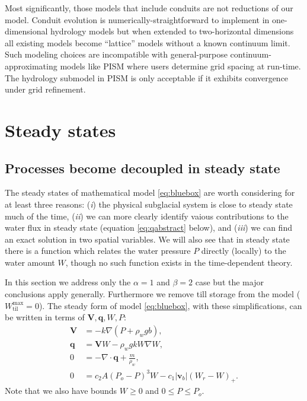 \documentclass[11pt,final]{amsart}
\newcommand\bv{\mathbf{v}}
\newcommand\bV{\mathbf{V}}
\newcommand\bq{\mathbf{q}}
\newcommand{\Div}{\nabla\cdot}
\newcommand{\grad}{\nabla}
\newcommand{\Wtilmax}{W_{\text{til}}^{\text{max}}}
\begin{document}
Most significantly, those models that include conduits \citep[among others]{Hewittetal2012,PimentelFlowers2011,Schoofmeltsupply} are not reductions of our model.  Conduit evolution is numerically-straightforward to implement in one-dimensional hydrology models \citep{Hewittetal2012,PimentelFlowers2011,vanderWeletal2013} but when extended to two-horizontal dimensions all existing models \citep{Hewitt2013,Schoofmeltsupply} become ``lattice'' models without a known continuum limit.  Such modeling choices are incompatible with general-purpose continuum-approximating models like PISM where users determine grid spacing at run-time.  The hydrology submodel in PISM is only acceptable if it exhibits convergence under grid refinement.


\section{Steady states}  \label{sec:steadyverif}

\subsection*{Processes become decoupled in steady state}  The steady states of mathematical model \eqref{eq:bluebox} are worth considering for at least three reasons: (\emph{i}) the physical subglacial system is close to steady state much of the time, (\emph{ii}) we can more clearly identify vaious contributions to the water flux in steady state (equation \eqref{eq:qabstract} below), and (\emph{iii}) we can find an exact solution in two spatial variables.  We will also see that in steady state there is a function which relates the water pressure $P$ directly (locally) to the water amount $W$, though no such function exists in the time-dependent theory.

In this section we address only the $\alpha=1$ and $\beta=2$ case but the major conclusions apply generally.  Furthermore we remove till storage from the model ($\Wtilmax=0$).  The steady form of model \eqref{eq:bluebox}, with these simplifications, can be written in terms of $\bV,\bq,W,P$:
\begin{align}
\bV &= - k \grad \left(P + \rho_w g b\right), \label{eq:Vsteady} \\
\bq &= \bV W - \rho_w g k W \grad W, \label{eq:qsteady} \\
0 &= - \Div \bq + \frac{m}{\rho_w}, \label{eq:masscontsteady} \\
0 &= c_2 A (P_o - P)^3 W - c_1 |\bv_b| (W_r - W)_+. \label{eq:openclosesteady}
\end{align}
Note that we also have bounds $W\ge 0$ and $0 \le P \le P_o$.
\end{document}
